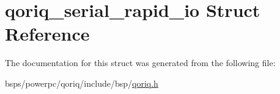\hypertarget{structqoriq__serial__rapid__io}{}\section{qoriq\+\_\+serial\+\_\+rapid\+\_\+io Struct Reference}
\label{structqoriq__serial__rapid__io}


The documentation for this struct was generated from the following file\+:\begin{DoxyCompactItemize}
\item 
bsps/powerpc/qoriq/include/bsp/\mbox{\hyperlink{qoriq_8h}{qoriq.\+h}}\end{DoxyCompactItemize}
